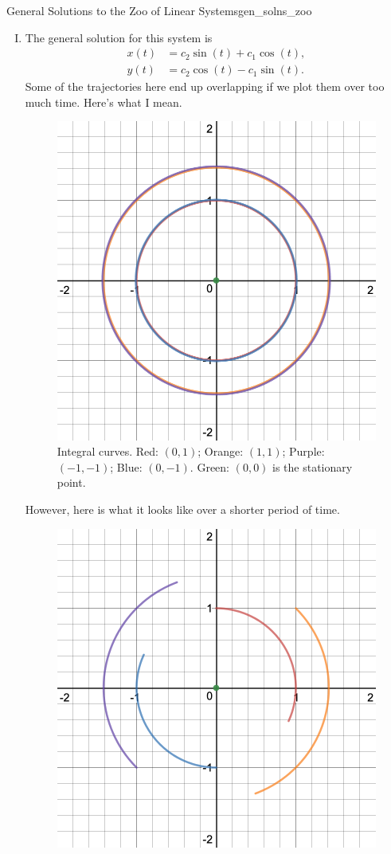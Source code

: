 \begin{ex}{General Solutions to the Zoo of Linear Systems}{gen_solns_zoo}
\begin{enumerate}[(I)]
\begin{figure}[H]
                \caption{Integral curves. Red: $(0,1)$; Orange: $(1,1)$; Purple: $(-1,-1)$; Blue: $(0,-1)$. Green: $(0,0)$ is the stationary point.}
            \end{figure}
            \item The general solution for this system is
            \begin{align*}
                x(t)&= c_2 \sin(t) + c_1 \cos(t),\\
                y(t)&= c_2 \cos(t) - c_1 \sin(t).
            \end{align*}
            Some of the trajectories here end up overlapping if we plot them over too much time.  Here's what I mean.
            \begin{figure}[H]
                \centering
                \includegraphics[width=.6\textwidth]{Figures_Part_7/y-xintegralcurves.png}
                \caption{Integral curves. Red: $(0,1)$; Orange: $(1,1)$; Purple: $(-1,-1)$; Blue: $(0,-1)$. Green: $(0,0)$ is the stationary point.}
                \label{fig:my_label}
            \end{figure}
            However, here is what it looks like over a shorter period of time.
            \begin{figure}[H]
                \centering
                \includegraphics[width=.6\textwidth]{Figures_Part_7/y-xintegralcurves2.png}

\end{figure}
\end{enumerate}
\end{ex}

